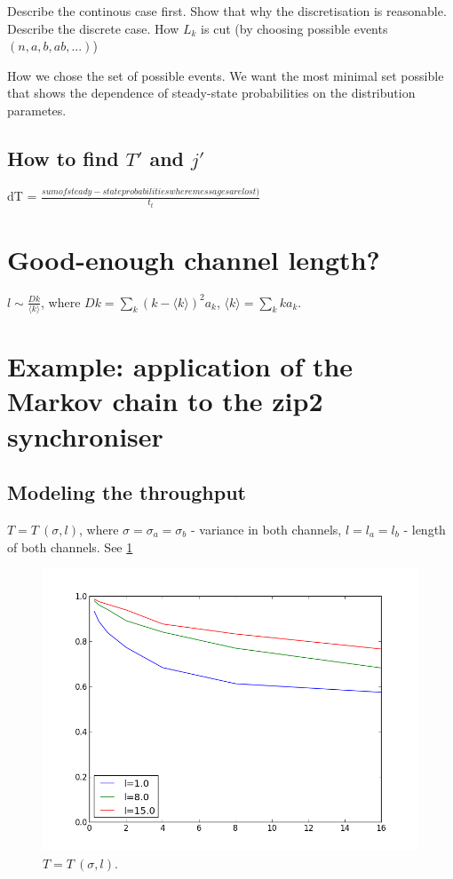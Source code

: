 Describe the continous case first. Show that why the discretisation is reasonable.
Describe the discrete case. How $L_{k}$ is cut (by choosing possible events $(n,a,b,ab,...)$)

How we chose the set of possible events. We want the most minimal set possible that shows the dependence of steady-state probabilities on the distribution parametes.

  \subsection{How to find $T'$ and $j'$}
dT = $\frac{sum of steady-state probabilities where messages are lost)}{t_{t}}$

\section{Good-enough channel length?}
$l \sim \frac{Dk}{\langle k \rangle}$, where $Dk = \sum_{k} (k - \langle k \rangle)^{2} a_{k}$, $\langle k \rangle = \sum_{k} k a_{k}$.


\section{Example: application of the Markov chain to the zip2 synchroniser}
  \subsection{Modeling the throughput}
$T = T \: (\sigma, l)$, where $\sigma = \sigma_{a} = \sigma_{b}$ - variance in both channels, $l = l_{a} = l_{b}$ - length of both channels. See \ref{fig:t_s}
    \begin{figure}[here]
    \centering
    \includegraphics[scale=0.4]{figs/thr_(disp,l).png}
    \caption{$T = T \: (\sigma, l)$.}
    \label{fig:t_s}
    \end{figure}

